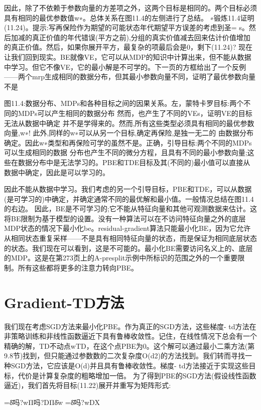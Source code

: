 因此，除了不依赖于参数向量的方差项之外，这两个目标是相同的。两个目标必须具有相同的最优参数值w∗。总体关系在图11.4的左侧进行了总结。
∗锻炼11.4证明(11.24)。提示:写再保险作为期望的可能状态年代期望平方误差的考虑到圣= s。然后加减的真正价值的年代错误(平方之前),分组的真实价值减去回来估计价值增加的真正价值。然后，如果你展开平方，最复杂的项最后会是0，剩下(11.24)?
现在让我们回到现实。BE就像VE，它可以从MDP的知识中计算出来，但不能从数据中学习。但它不像VE，它的最小解是不可学的。下一页的方框给出了一个反例——两个mrp生成相同的数据分布，但其最小参数向量不同，证明了最优参数向量不是

图11.4:数据分布、MDPs和各种目标之间的因果关系。左，蒙特卡罗目标:两个不同的MDPs可以产生相同的数据分布
然而，也产生了不同的VEs，证明VE的目标无法从数据中确定
并不是学得来的。然而,所有这些类型必须具有相同的最优参数向量,w∗!
此外,同样的w∗可以从另一个目标,确定再保险,是独一无二的
由数据分布确定。因此w∗类型和再保险可学的虽然不是。正确，引导目标:两个不同的MDPs可以生成相同的数据
分布也产生不同的微分方程，且具有不同的最小参数向量;这些在数据分布中是无法学习的。PBE和TDE目标及其(不同的)最小值可以直接从数据中确定，因此是可以学习的。




因此不能从数据中学习。我们考虑的另一个引导目标，PBE和TDE，可以从数据(是可学习的)中确定，并确定通常不同的最优解和最小值。一般情况总结在图11.4的右边。
因此，BE是不可学习的;它不能从特征向量和其他可观测数据来估计。这将BE限制为基于模型的设置。没有一种算法可以在不访问特征向量之外的底层MDP状态的情况下最小化be。residual-gradient算法只能最小化BE，因为它允许从相同状态重复采样——不是具有相同特征向量的状态，而是保证为相同底层状态的状态。我们现在可以看到，这是不可能的。最小化BE需要访问名义上的、底层的MDP。这是在第273页上的A-presplit示例中所标识的范围之外的一个重要限制。所有这些都将更多的注意力转向PBE。

\section{Gradient-TD方法}

我们现在考虑SGD方法来最小化PBE。作为真正的SGD方法，这些梯度- td方法在非策略训练和非线性函数逼近下具有鲁棒收敛性。记住，在线性情况下总会有一个精确的解，TD不动点wTD，在这个点PBE为0。这个解可以通过最小二乘方法(第9.8节)找到，但只能通过参数数的二次复杂度O(d2)的方法找到。我们转而寻找一种SGD方法，它应该是O(d)并且具有鲁棒收敛性。梯度- td方法接近于实现这些目标，代价是计算复杂度的粗略增加一倍。
为了得到PBE的SGD方法(假设线性函数逼近)，我们首先将目标(11.22)展开并重写为矩阵形式:
 
=δ̄吗?wΠ吗?DΠδ̄w =δ̄吗?wDX

